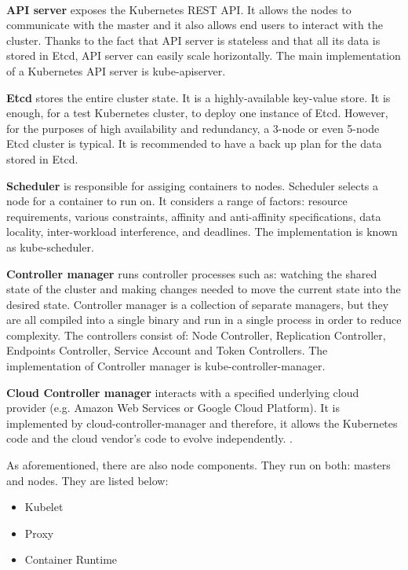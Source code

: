 \paragraph{}
\textbf{API server} exposes the Kubernetes REST API. It allows the nodes to communicate with the master and it also allows end users to interact with the cluster. Thanks to the fact that API server is stateless and that all its data is stored in Etcd, API server can easily scale horizontally. The main implementation of a Kubernetes API server is kube-apiserver\cite{book-mastering-k8s}\cite{k8s-cluster,k8s-components}.

\textbf{Etcd} stores the entire cluster state. It is a highly-available key-value store. It is enough, for a test Kubernetes cluster, to deploy one instance of Etcd. However, for the purposes of high availability and redundancy, a 3-node or even 5-node Etcd cluster is typical. It is recommended to have a back up plan for the data stored in Etcd\cite{book-mastering-k8s}\cite{k8s-components}.

\textbf{Scheduler} is responsible for assiging containers to nodes. Scheduler selects a node for a container to run on. It considers a range of factors: resource requirements, various constraints, affinity and anti-affinity specifications, data locality, inter-workload interference, and deadlines. The implementation is known as kube-scheduler\cite{book-mastering-k8s}\cite{k8s-components}.

\textbf{Controller manager} runs controller processes such as: watching the shared state of the cluster and making changes needed to move the current state into the desired state. Controller manager is a collection of separate managers, but they are all compiled into a single binary and run in a single process in order to reduce complexity. The controllers consist of: Node Controller, Replication Controller, Endpoints Controller, Service Account and Token Controllers. The implementation of Controller manager is kube-controller-manager\cite{book-mastering-k8s}\cite{k8s-components}.

\textbf{Cloud Controller manager} interacts with a specified underlying cloud provider (e.g. Amazon Web Services or Google Cloud Platform). It is implemented by cloud-controller-manager and therefore, it allows the Kubernetes code and the cloud vendor’s code to evolve independently. \cite{k8s-components}.

As aforementioned, there are also node components. They run on both: masters and nodes. They are listed below\cite{book-mastering-k8s}\cite{k8s-components}:
\begin{itemize}
\item Kubelet
\item Proxy
\item Container Runtime
\end{itemize}

